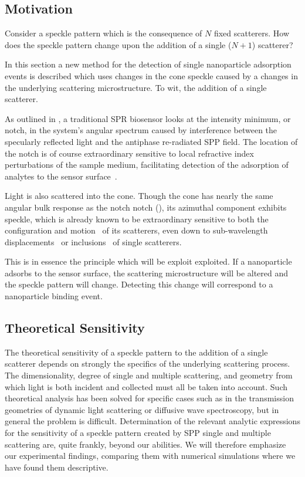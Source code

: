 \subsection{Motivation}
Consider a speckle pattern which is the consequence of $N$ fixed
scatterers.  How does the speckle pattern change upon the addition of a
single ($N+1$) scatterer?  

In this section a new method for the detection of single nanoparticle
adsorption events is described which uses changes in the cone speckle
caused by a changes in the underlying scattering microstructure.  To wit,
the addition of a single scatterer.

As outlined in , a traditional SPR biosensor looks at
the intensity minimum, or notch, in the system's angular spectrum caused by
interference between the specularly reflected light and the antiphase
re-radiated SPP field.  The location of the notch is of course
extraordinary sensitive to local refractive index perturbations of the
sample medium, facilitating detection of the adsorption of analytes to the
sensor surface~\cite{homola1999surface}.  

Light is also scattered into the cone.  Though the cone has nearly the same
angular bulk response as the notch notch (), its
azimuthal component exhibits speckle, which is already known to be
extraordinary sensitive to both the configuration and
motion~\cite{berkovits1994correlations} of its scatterers, even down to
sub-wavelength displacements~\cite{berkovits1991sensitivity} or
inclusions~\cite{berkovits1990theory} of single scatterers.

This is in essence the principle which will be exploit exploited.  If a
nanoparticle adsorbs to the sensor surface, the scattering microstructure
will be altered and the speckle pattern will change.  Detecting this change
will correspond to a nanoparticle binding event.

\subsection{Theoretical Sensitivity}
The theoretical sensitivity of a speckle pattern to the addition of a
single scatterer depends on strongly the specifics of the underlying
scattering process.  The dimensionality, degree of single and multiple
scattering, and geometry from which light is both incident and collected
must all be taken into account.  Such theoretical analysis has been solved
for specific cases such as in the transmission geometries of dynamic light
scattering or diffusive wave spectroscopy, but in general the problem is
difficult.  Determination of the relevant analytic expressions for the
sensitivity of a speckle pattern created by SPP single and multiple
scattering are, quite frankly, beyond our abilities.  We will therefore
emphasize our experimental findings, comparing them with numerical
simulations where we have found them descriptive.

